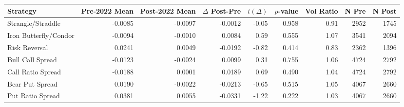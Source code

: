 \begin{tabular}{lrrrrrrrr}
\toprule
Strategy & Pre-2022 Mean & Post-2022 Mean & $\Delta$ Post-Pre & $t(\Delta)$ & $p$-value & Vol Ratio & N Pre & N Post \\
\midrule
Strangle/Straddle & -0.0085 & -0.0097 & -0.0012 & -0.05 & 0.958 & 0.91 & 2952 & 1745 \\
Iron Butterfly/Condor & -0.0094 & -0.0010 & 0.0084 & 0.59 & 0.555 & 1.07 & 3541 & 2094 \\
Risk Reversal & 0.0241 & 0.0049 & -0.0192 & -0.82 & 0.414 & 0.83 & 2362 & 1396 \\
Bull Call Spread & -0.0123 & -0.0024 & 0.0099 & 0.31 & 0.755 & 1.06 & 4724 & 2792 \\
Call Ratio Spread & -0.0188 & 0.0001 & 0.0189 & 0.69 & 0.490 & 1.04 & 4724 & 2792 \\
Bear Put Spread & 0.0190 & -0.0022 & -0.0213 & -0.65 & 0.515 & 1.05 & 4067 & 2660 \\
Put Ratio Spread & 0.0381 & 0.0055 & -0.0331 & -1.22 & 0.222 & 1.03 & 4067 & 2660 \\
\bottomrule
\end{tabular}
